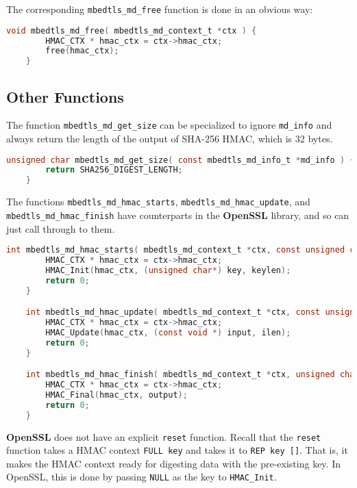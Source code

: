 \documentclass[pageno]{jpaper}
\newcommand{\stdtitle}[1]{\textbf{#1}}
\begin{document}
The corresponding \lstinline{mbedtls_md_free} function is done in an obvious way:

\begin{lstlisting}[language=C]
    void mbedtls_md_free( mbedtls_md_context_t *ctx ) {
        HMAC_CTX * hmac_ctx = ctx->hmac_ctx;
        free(hmac_ctx);
    }
\end{lstlisting}


\subsection{Other Functions}

The function \lstinline{mbedtls_md_get_size} can be specialized to ignore \lstinline{md_info} and always return the length of the output of SHA-256 HMAC, which is 32 bytes.

\begin{lstlisting}[language=C]
    unsigned char mbedtls_md_get_size( const mbedtls_md_info_t *md_info ) {
        return SHA256_DIGEST_LENGTH;
    }
\end{lstlisting}

The functions \lstinline{mbedtls_md_hmac_starts}, \lstinline{mbedtls_md_hmac_update}, and\\ \lstinline{mbedtls_md_hmac_finish} have counterparts in the \stdtitle{OpenSSL} library, and so can just call through to them.

\begin{lstlisting}[language=C]
    int mbedtls_md_hmac_starts( mbedtls_md_context_t *ctx, const unsigned char *key, size_t keylen ) {
        HMAC_CTX * hmac_ctx = ctx->hmac_ctx;
        HMAC_Init(hmac_ctx, (unsigned char*) key, keylen);
        return 0;
    }

    int mbedtls_md_hmac_update( mbedtls_md_context_t *ctx, const unsigned char *input, size_t ilen ) {
        HMAC_CTX * hmac_ctx = ctx->hmac_ctx;
        HMAC_Update(hmac_ctx, (const void *) input, ilen);
        return 0;
    }

    int mbedtls_md_hmac_finish( mbedtls_md_context_t *ctx, unsigned char *output) {
        HMAC_CTX * hmac_ctx = ctx->hmac_ctx;
        HMAC_Final(hmac_ctx, output);
        return 0;
    }
\end{lstlisting}

\stdtitle{OpenSSL} does not have an explicit \lstinline{reset} function. Recall that the \lstinline{reset} function takes a HMAC context \lstinline{FULL key} and takes it to \lstinline{REP key []}. That is, it makes the HMAC context ready for digesting data with the pre-existing key. In OpenSSL, this is done by passing \lstinline{NULL} as the key to \lstinline{HMAC_Init}.
\end{document}
